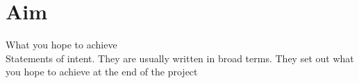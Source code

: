 \section{Aim}

What you hope to achieve\\
Statements of intent. They are usually written in broad terms. They set out what you hope to achieve at the end of the project